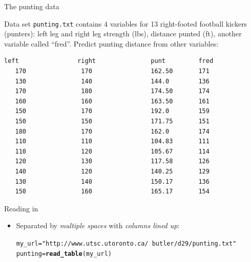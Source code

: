 \documentclass[unknownkeysallowed]{beamer}\usepackage[]{graphicx}\usepackage[]{color}
\makeatletter
\newcommand{\hlstr}[1]{\textcolor[rgb]{0.192,0.494,0.8}{#1}}%
\newcommand{\hlstd}[1]{\textcolor[rgb]{0.345,0.345,0.345}{#1}}%
\newcommand{\hlkwb}[1]{\textcolor[rgb]{0.69,0.353,0.396}{#1}}%
\newcommand{\hlkwd}[1]{\textcolor[rgb]{0.737,0.353,0.396}{\textbf{#1}}}%
\newenvironment{kframe}{%
 \def\at@end@of@kframe{}%
 \ifinner\ifhmode%
  \def\at@end@of@kframe{\end{minipage}}%
  \begin{minipage}{\columnwidth}%
 \fi\fi%
 \def\FrameCommand##1{\hskip\@totalleftmargin \hskip-\fboxsep
 \colorbox{shadecolor}{##1}\hskip-\fboxsep
     \hskip-\linewidth \hskip-\@totalleftmargin \hskip\columnwidth}%
 \MakeFramed {\advance\hsize-\width
   \@totalleftmargin\z@ \linewidth\hsize
   \@setminipage}}%
 {\par\unskip\endMakeFramed%
 \at@end@of@kframe}
\newenvironment{knitrout}{}{} %
\makeatother
\begin{document}
\begin{frame}[fragile]{The punting data}

  Data set \verb-punting.txt- contains 4 variables for 13 right-footed
  football kickers (punters): left leg and right leg strength (lbs),
  distance punted (ft), another variable called ``fred''. Predict
  punting distance from other variables:

  \begin{scriptsize}
\begin{verbatim}
left                right               punt         fred
   170               170                162.50       171 
   130               140                144.0        136   
   170               180                174.50       174 
   160               160                163.50       161 
   150               170                192.0        159 
   150               150                171.75       151 
   180               170                162.0        174 
   110               110                104.83       111 
   110               120                105.67       114 
   120               130                117.58       126 
   140               120                140.25       129  
   130               140                150.17       136 
   150               160                165.17       154 
\end{verbatim}
    
  \end{scriptsize}
  
  
  
  
\end{frame}

\begin{frame}[fragile]{Reading in}
  
  \begin{itemize}
  \item Separated by \emph{multiple spaces} with \emph{columns lined up}:
    
\begin{knitrout}
\color{fgcolor}\begin{kframe}
\begin{alltt}
\hlstd{my_url}\hlkwb{=}\hlstr{"http://www.utsc.utoronto.ca/~butler/d29/punting.txt"}
\hlstd{punting}\hlkwb{=}\hlkwd{read_table}\hlstd{(my_url)}
\end{alltt}


{\ttfamily\noindent\itshape\color{messagecolor}{\#\# Parsed with column specification:\\\#\# cols(\\\#\#\ \  left = col\_integer(),\\\#\#\ \  right = col\_integer(),\\\#\#\ \  punt = col\_double(),\\\#\#\ \  fred = col\_integer()\\\#\# )}}\end{kframe}
\end{knitrout}
  \end{itemize}
  
\end{frame}
\end{document}
